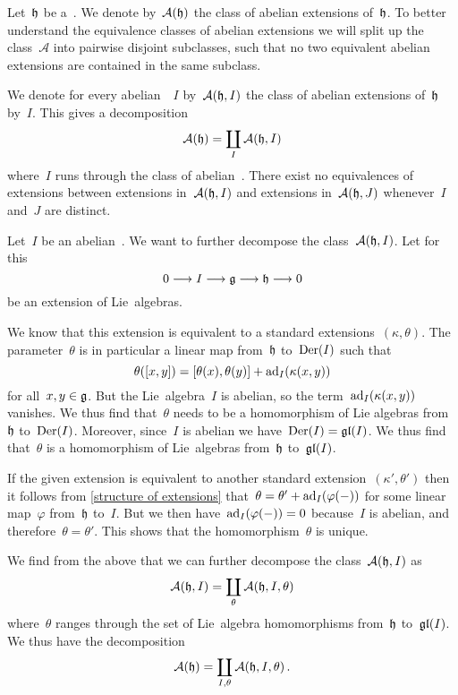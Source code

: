 \begin{fluff}
  \label{discussing abelian extensions}
  Let~$\mathfrak{h}$ be a~\liealgebra{$\kf$}.
  We denote by~$\mathcal{A}(\mathfrak{h})$ the class of abelian extensions of~$\mathfrak{h}$.
  To better understand the equivalence classes of abelian extensions we will split up the class~$\mathcal{A}$ into pairwise disjoint subclasses, such that no two equivalent abelian extensions are contained in the same subclass.

  We denote for every abelian~\liealgebra{$\kf$}~$I$ by~$\mathcal{A}(\mathfrak{h}, I)$ the class of abelian extensions of~$\mathfrak{h}$ by~$I$.
  This gives a decomposition
  \[
    \mathcal{A}(\mathfrak{h})
    =
    \coprod_I
    \mathcal{A}(\mathfrak{h}, I)
  \]
  where~$I$ runs through the class of abelian~\liealgebras{$\kf$}.
  There exist no equivalences of extensions between extensions in~$\mathcal{A}(\mathfrak{h}, I)$ and extensions in~$\mathcal{A}(\mathfrak{h}, J)$ whenever~$I$ and~$J$ are distinct.

  Let~$I$ be an abelian~\liealgebra{$\kf$}.
  We want to further decompose the class~$\mathcal{A}(\mathfrak{h}, I)$.
  Let for this
  \[
    0 \to I \to \glie \to \hlie \to 0
  \]
  be an extension of Lie~algebras.

  We know that this extension is equivalent to a standard extensions~$(\kappa, \theta)$.
  The parameter~$\theta$ is in particular a linear map from~$\mathfrak{h}$ to~$\operatorname{Der}(I)$ such that
  \[
    \theta( [x,y] )
    =
    [ \theta(x), \theta(y) ] + \operatorname{ad}_I( \kappa(x,y) )
  \]
  for all~$x, y \in \mathfrak{g}$.
  But the Lie~algebra~$I$ is abelian, so the term~$\operatorname{ad}_I( \kappa(x,y) )$ vanishes.
  We thus find that~$\theta$ needs to be a homomorphism of Lie algebras from~$\mathfrak{h}$ to~$\operatorname{Der}(I)$.
  Moreover, since~$I$ is abelian we have~$\operatorname{Der}(I) = \mathfrak{gl}(I)$.
  We thus find that~$\theta$ is a homomorphism of Lie~algebras from~$\mathfrak{h}$ to~$\mathfrak{gl}(I)$.

  If the given extension is equivalent to another standard extension~$(\kappa', \theta')$ then it follows from \cref{structure of extensions} that~$\theta = \theta' + \operatorname{ad}_I(\varphi(-))$ for some linear map~$\varphi$ from~$\mathfrak{h}$ to~$I$.
  But we then have~$\operatorname{ad}_I(\varphi(-)) = 0$ because~$I$ is abelian, and therefore~$\theta = \theta'$.
  This shows that the homomorphism~$\theta$ is unique.

  We find from the above that we can further decompose the class~$\mathcal{A}(\mathfrak{h}, I)$ as
  \[
    \mathcal{A}(\mathfrak{h}, I)
    =
    \coprod_{\theta}
    \mathcal{A}(\mathfrak{h}, I, \theta)
  \]
  where~$\theta$ ranges through the set of Lie~algebra homomorphisms from~$\mathfrak{h}$ to~$\mathfrak{gl}(I)$.
  We thus have the decomposition
  \[
    \mathcal{A}(\mathfrak{h})
    =
    \coprod_{I, \theta}
    \mathcal{A}(\mathfrak{h}, I, \theta) \,.
  \]


\end{fluff}
